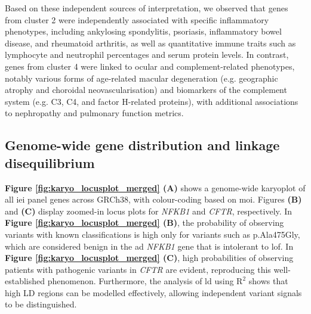 Based on these independent sources of interpretation, we observed that genes from cluster 2 were independently associated with specific inflammatory phenotypes, including ankylosing spondylitis, psoriasis, inflammatory bowel disease, and rheumatoid arthritis, as well as quantitative immune traits such as lymphocyte and neutrophil percentages and serum protein levels.
In contrast, genes from cluster 4 were linked to ocular and complement-related phenotypes, notably various forms of age-related macular degeneration (e.g. geographic atrophy and choroidal neovascularisation) and biomarkers of the complement system (e.g. C3, C4, and factor H-related proteins), with additional associations to nephropathy and pulmonary function metrics.

\subsection{Genome-wide gene distribution and linkage disequilibrium}

\textbf{Figure \ref{fig:karyo_locusplot_merged} (A)} shows a genome-wide karyoplot of all \ac{iei} panel genes across GRCh38, with colour-coding based on \ac{moi}. Figures \textbf{(B)} and \textbf{(C)} display zoomed-in locus plots for \textit{NFKB1} and \textit{CFTR}, respectively. 
In \textbf{Figure \ref{fig:karyo_locusplot_merged} (B)}, the probability of observing variants with known classifications is high only for variants such as p.Ala475Gly, which are considered benign in the \ac{ad} \textit{NFKB1} gene that is intolerant to \ac{lof}. 
In \textbf{Figure \ref{fig:karyo_locusplot_merged} (C)}, high probabilities of observing patients with pathogenic variants in \textit{CFTR} are evident, reproducing this well-established phenomenon. Furthermore, the analysis of \ac{ld} using $\text{R}^2$ shows that high LD regions can be modelled effectively, allowing independent variant signals to be distinguished.

